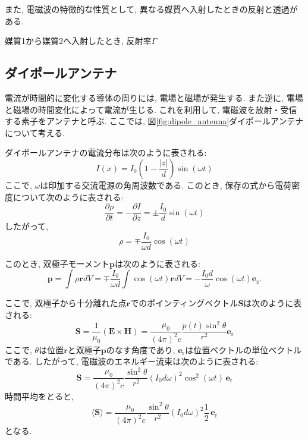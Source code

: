 \documentclass[uplatex,dvipdfmx,a4j,12pt]{jsarticle}
\begin{document}
\enskip

また, 電磁波の特徴的な性質として, 異なる媒質へ入射したときの反射と透過がある.

媒質1から媒質2へ入射したとき, 反射率$\Gamma$



\subsection{ダイポールアンテナ}
電流が時間的に変化する導体の周りには, 電場と磁場が発生する.
また逆に, 電場と磁場の時間変化によって電流が生じる.
これを利用して, 電磁波を放射・受信する素子をアンテナと呼ぶ.
ここでは, 図\ref{fig:dipole_antenna}ダイポールアンテナについて考える.

ダイポールアンテナの電流分布は次のように表される:
\begin{equation}
    I(x) = I_0 \left(1 - \frac{|z|}{d}\right)\sin\left(\omega t\right)
\end{equation}
ここで, $\omega$は印加する交流電源の角周波数である.
このとき, 保存の式から電荷密度について次のように表される:
\begin{equation}
  \frac{\partial \rho}{\partial t}  = - \frac{\partial I}{\partial z} = \pm \frac{I_0}{d}\sin\left(\omega t\right)
\end{equation}
したがって, 
\begin{equation}
  \rho = \mp \frac{I_0}{\omega d}\cos\left(\omega t\right)
\end{equation}

このとき, 双極子モーメント$\mathbf{p}$は次のように表される:
\begin{equation}
  \mathbf{p} = \int \rho \mathbf{r} dV = \mp \frac{I_0}{\omega d}\int \cos\left(\omega t\right) \mathbf{r} dV
  = -\frac{I_0 d}{\omega}\cos\left(\omega t\right) \mathbf{e}_\mathrm{z}.
\end{equation}

ここで, 双極子から十分離れた点$\mathbf{r}$でのポインティングベクトル$\mathbf{S}$は次のように表される:
\begin{equation}
  \mathbf{S} = \frac{1}{\mu_0}\left(\mathbf{E} \times \mathbf{H}\right) =
  \frac{\mu_0}{(4\pi)^2c} \frac{\ddot{p}(t)\sin^2\theta}{r^2}\mathbf{e}_\mathrm{r}
\end{equation}
ここで, $\theta$は位置$\mathbf{r}$と双極子$\mathbf{p}$のなす角度であり, $\mathbf{e}_\mathrm{r}$は位置ベクトルの単位ベクトルである.
したがって, 電磁波のエネルギー流束は次のように表される:
\begin{equation}
  \mathbf{S} = \frac{\mu_0}{(4\pi)^2c} \frac{\sin^2\theta}{r^2}(I_0 d \omega)^2 \cos^2\left(\omega t\right)\,\mathbf{e}_\mathrm{r}
\end{equation}
時間平均をとると,
\begin{equation}
  \langle \mathbf{S} \rangle = \frac{\mu_0}{(4\pi)^2c} \frac{\sin^2\theta}{r^2}(I_0 d \omega)^2 \frac{1}{2}\,\mathbf{e}_\mathrm{r}
\end{equation}
となる.
\end{document}
